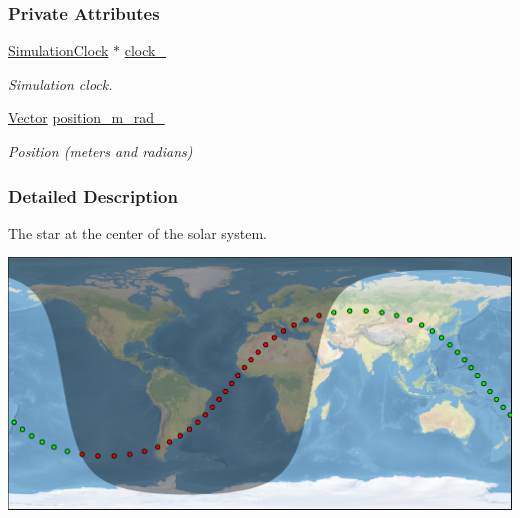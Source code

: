 \subsubsection*{Private Attributes}
\begin{DoxyCompactItemize}
\item 
\mbox{\label{classosse_1_1collaborate_1_1_sun_af8b5c5ffc840e8cf30e62f8ea37eb82e}} 
\hyperlink{classosse_1_1collaborate_1_1_simulation_clock}{Simulation\+Clock} $\ast$ \hyperlink{classosse_1_1collaborate_1_1_sun_af8b5c5ffc840e8cf30e62f8ea37eb82e}{clock\+\_\+}
\begin{DoxyCompactList}\small\item\em Simulation clock. \end{DoxyCompactList}\item 
\mbox{\label{classosse_1_1collaborate_1_1_sun_aea321687f39a904c3b35b60058a60b5b}} 
\hyperlink{classosse_1_1collaborate_1_1_vector}{Vector} \hyperlink{classosse_1_1collaborate_1_1_sun_aea321687f39a904c3b35b60058a60b5b}{position\+\_\+m\+\_\+rad\+\_\+}
\begin{DoxyCompactList}\small\item\em Position (meters and radians) \end{DoxyCompactList}\end{DoxyCompactItemize}


\subsubsection{Detailed Description}
The star at the center of the solar system. 

 
\begin{DoxyImageNoCaption}
  \mbox{\includegraphics[width=\textwidth]{sun}}
\end{DoxyImageNoCaption}
 

